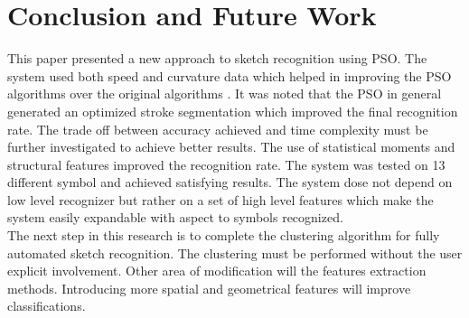\documentclass[a4paper,10pt]{IEEEconf}
\begin{document}
\section{Conclusion and Future Work}
\label{ConclusionandFutureWork}
This paper presented a new approach to sketch recognition using PSO. The system used both speed and curvature data which helped in improving the PSO algorithms over the original algorithms \cite{CruveDivisionSwarm,PolygonApproximationPSO}. It was noted that the PSO in general generated an optimized stroke segmentation which improved the final recognition rate.  The trade off between accuracy achieved and time complexity must be further investigated to achieve better results. The use of statistical moments and structural features improved the recognition rate. The system was tested on 13 different symbol and achieved satisfying results. The system dose not depend on low level recognizer but rather on a set of high level features which make the system easily expandable with aspect to symbols recognized. \\  
The next step in this research is to complete the clustering algorithm for fully automated sketch recognition. The clustering must be performed without the user explicit involvement. Other area of modification will the features extraction methods. Introducing more spatial and geometrical features will improve classifications.  %
%

\end{document}

